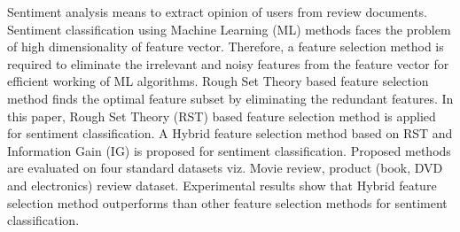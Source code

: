 Sentiment analysis means to extract opinion of users from review documents. Sentiment classification using Machine Learning (ML) methods faces the problem
 of high dimensionality of feature vector. Therefore, a feature selection method
 is required to eliminate the irrelevant and noisy features from the feature
 vector for efficient working of ML algorithms. Rough Set Theory based feature
 selection method finds the optimal feature subset by eliminating the redundant
 features. In this paper, Rough Set Theory (RST) based feature selection method
 is applied for sentiment classification. A Hybrid feature selection method
 based on RST and Information Gain (IG) is proposed for sentiment
 classification. Proposed methods are evaluated on four standard datasets viz.
 Movie review, product (book, DVD and electronics) review dataset. Experimental
 results show that Hybrid feature selection method outperforms than other
 feature selection methods for sentiment classification.

